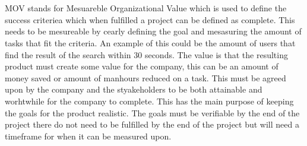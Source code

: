 \documentclass[12pt,a4paper]{report}
\begin{document}
    \section*{}
    MOV stands for Mesuareble Organizational Value which is used to define the success criteriea which when fulfilled a project can be defined as complete. This needs to be mesureable by cearly defining the goal and mesasuring the amount of tasks that fit the criteria. An example of this could be the amount of users that find the result of the search within 30 seconds. The value is that the resulting product must create some value for the company, this can be an amount of money saved or amount of manhours reduced on a task. This must be agreed upon by the company and the styakeholders to be both attainable and worhtwhile for the company to complete. This has the main purpose of keeping the goals for the product realistic. The goals must be verifiable by the end of the project there do not need to be fulfilled by the end of the project but will need a timeframe for when it can be measured upon.
    
\end{document}
